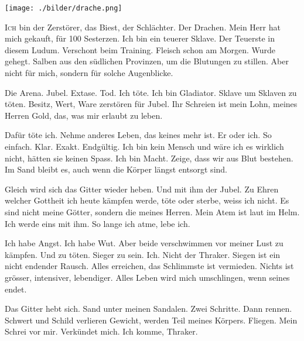 ﻿\thispagestyle{empty}
\begin{center}
\texttt{[image: ./bilder/drache.png]}
\end{center}
\vspace*{\fill}
{\centering\fontsize{50}{48} \color{farbe}\par}
\newpage
\lettrine[lines=3, lhang=.2, loversize=.25, lraise=0.05, findent=0.1em,
nindent=0em]{I}{ch} bin der Zerstörer, das Biest, der Schlächter. Der Drachen. Mein Herr hat mich gekauft, für 100 Sesterzen. Ich bin ein teuerer Sklave. Der Teuerste in diesem Ludum. Verschont beim Training. Fleisch schon am Morgen. Wurde gehegt. Salben aus den südlichen Provinzen, um die Blutungen zu stillen. Aber nicht für mich, sondern für solche Augenblicke.

Die Arena. Jubel. Extase. Tod. Ich töte. Ich bin Gladiator. Sklave um Sklaven zu töten. Besitz, Wert, Ware zerstören für Jubel. Ihr Schreien ist mein Lohn, meines Herren Gold, das, was mir erlaubt zu leben.  

Dafür töte ich. Nehme anderes Leben, das keines mehr ist. Er oder ich. So einfach. Klar. Exakt. Endgültig. Ich bin kein Mensch und wäre ich es wirklich nicht, hätten sie keinen Spass. Ich bin Macht. Zeige, dass wir aus Blut bestehen. Im Sand bleibt es, auch wenn die Körper längst entsorgt sind. 

Gleich wird sich das Gitter wieder heben. Und mit ihm der Jubel. Zu Ehren welcher Gottheit ich heute kämpfen werde, töte oder sterbe, weiss ich nicht. Es sind nicht meine Götter, sondern die meines Herren. Mein Atem ist laut im Helm. Ich werde eins mit ihm. So lange ich atme, lebe ich. 

Ich habe Angst. Ich habe Wut. Aber beide verschwimmen vor meiner Lust zu kämpfen. Und zu töten. Sieger zu sein. Ich. Nicht der Thraker. Siegen ist ein nicht endender Rausch. Alles erreichen, das Schlimmste ist vermieden. Nichts ist grösser, intensiver, lebendiger. Alles Leben wird mich umschlingen, wenn seines endet. 

Das Gitter hebt sich. Sand unter meinen Sandalen. Zwei Schritte. Dann rennen. Schwert und Schild verlieren Gewicht, werden Teil meines Körpers. Fliegen. Mein Schrei vor mir. Verkündet mich. Ich komme, Thraker.  \hfill {}
\newpage
 

